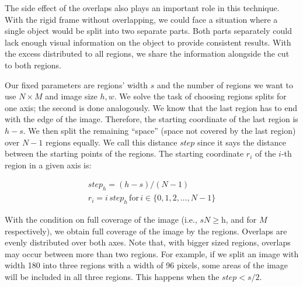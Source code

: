 The side effect of the overlaps also plays an important role in this technique. With the rigid frame without overlapping, we could face a situation where a single object would be split into two separate parts. Both parts separately could lack enough visual information on the object to provide consistent results. With the excess distributed to all regions, we share the information alongside the cut to both regions.

Our fixed parameters are regions' width $s$ and the number of regions we want to use $N \times M$ and image size $h, w$. We solve the task of choosing regions splits for one axis; the second is done analogously. We know that the last region has to end with the edge of the image. Therefore, the starting coordinate of the last region is $h - s$. We then split the remaining ``space'' (space not covered by the last region) over $N-1$ regions equally. We call this distance $step$ since it says the distance between the starting points of the regions. The starting coordinate $r_i$ of the $i$-th region in a given axis is:

\begin{align*}
step_h = (h - s) / (N - 1) \\
r_i = {i \, step_h\,\text{for}\,i \in \{0, 1, 2, \dots, N - 1\}}
\end{align*}






With the condition on full coverage of the image (i.e., $s N \geq \text{h}$, and for $M$ respectively), we obtain full coverage of the image by the regions. Overlaps are evenly distributed over both axes. Note that, with bigger sized regions, overlaps may occur between more than two regions. For example, if we split an image with width 180 into three regions with a width of 96 pixels, some areas of the image will be included in all three regions. This happens when the $step < s/2$.

